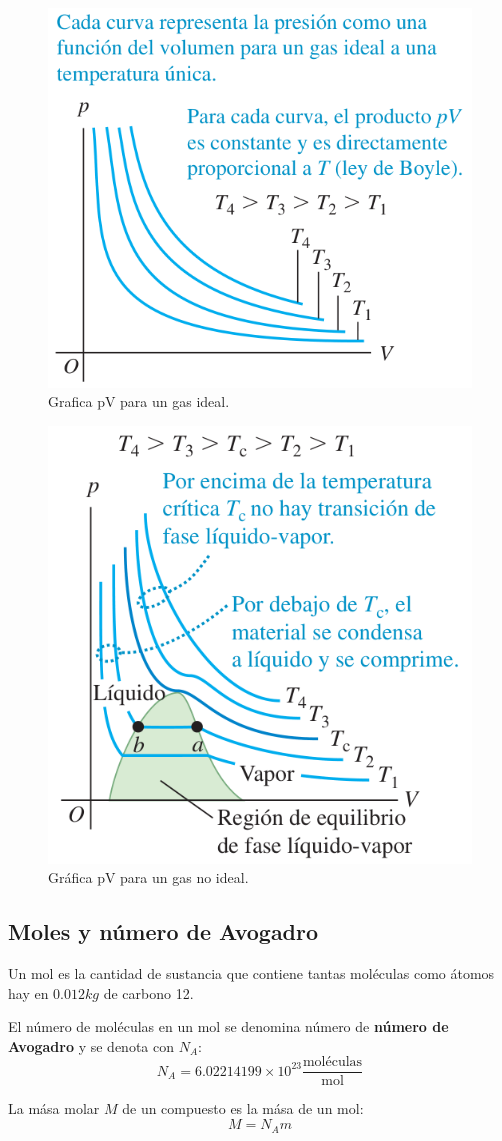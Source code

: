 \documentclass[12pt]{article}
\begin{document}
  \begin{figure}[H]
    \centering
    \includegraphics[width=0.5\linewidth]{imagenes/g-pv-gas-ideal.png}
    \caption{Grafica pV para un gas ideal.}
    \label{fig:pv-gas-ideal}
  \end{figure}
  
  \begin{figure}[H]
    \centering
    \includegraphics[width=0.5\linewidth]{imagenes/g-pv-gas-no-ideal.png}
    \caption{Gráfica pV para un gas no ideal.}
    \label{fig:pv-gas-no-ideal}
  \end{figure}

  \subsection{Moles y número de Avogadro}
  Un mol es la cantidad de sustancia que contiene tantas moléculas como átomos hay en $ 0.012kg $ de carbono 12.

  El número de moléculas en un mol se denomina número de \textbf{número de Avogadro} y se denota con $ N_{A} $:
  \[
  N_{A} = 6.02214199\times 10^{23}\frac{\text{moléculas}}{\text{mol}}
  \]

  La mása molar $ M $ de un compuesto es la mása de un mol:
  \[
  M = N_{A}m
  \]
  
\end{document}

